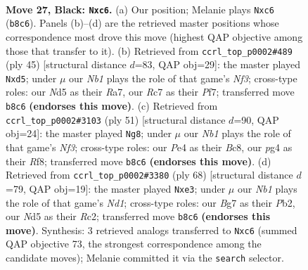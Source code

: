 \documentclass[11pt]{article}
\begin{document}
\clearpage

\begin{figure}[p]\centering
\begin{subfigure}{0.46\textwidth}\centering
\resizebox{\linewidth}{!}{%
\newchessgame
\chessboard[
  setfen={rn4k1/p1r3bp/PpN2p2/1P1n1R2/4pPP1/8/4B3/R1B1K3 b Q - 3 27},
  showmover=false,
  pgfstyle=straightmove, color=movearrow, markmove={b8-c6}
]}
\caption{}
\end{subfigure}\hfill
\begin{subfigure}{0.46\textwidth}\centering
\resizebox{\linewidth}{!}{%
\newchessgame
\chessboard[
  setfen={2b3k1/r4pp1/1p3n1p/p2N4/P1n2B2/2P3P1/4rPBP/RR4K1 b - - 0 23},
  showmover=false,
  pgfstyle=straightmove, color=movearrow, markmove={f6-d5}
]}
\caption{}
\end{subfigure}
\\[4pt]
\begin{subfigure}{0.46\textwidth}\centering
\resizebox{\linewidth}{!}{%
\newchessgame
\chessboard[
  setfen={1kb2r2/p2r3p/1p3npR/2pP4/2B3P1/1PN2P2/P7/2K3R1 b - - 8 26},
  showmover=false,
  pgfstyle=straightmove, color=movearrow, markmove={f6-g8}
]}
\caption{}
\end{subfigure}\hfill
\begin{subfigure}{0.46\textwidth}\centering
\resizebox{\linewidth}{!}{%
\newchessgame
\chessboard[
  setfen={1r4k1/r4p2/8/p1p3bp/P2p4/2P1nBP1/1PR4P/3NRK2 w - - 2 35},
  showmover=false,
  pgfstyle=straightmove, color=movearrow, markmove={d1-e3}
]}
\caption{}
\end{subfigure}
\caption{\textbf{Move 27, Black: \texttt{Nxc6}.} (a) Our position; Melanie plays \texttt{Nxc6} (\texttt{b8c6}). Panels (b)--(d) are the retrieved master positions whose correspondence most drove this move (highest QAP objective among those that transfer to it). (b) Retrieved from \texttt{ccrl\_top\_p0002\#489} (ply 45) [structural distance $d$=83, QAP obj=29]: the master played \texttt{Nxd5}; under $\mu$ our \emph{Nb1} plays the role of that game's \emph{Nf3}; cross-type roles: our \emph{N}d5 as their \emph{R}a7, our \emph{R}c7 as their \emph{P}f7; transferred move \texttt{b8c6} \textbf{(endorses this move)}. (c) Retrieved from \texttt{ccrl\_top\_p0002\#3103} (ply 51) [structural distance $d$=90, QAP obj=24]: the master played \texttt{Ng8}; under $\mu$ our \emph{Nb1} plays the role of that game's \emph{Nf3}; cross-type roles: our \emph{P}e4 as their \emph{B}c8, our \emph{p}g4 as their \emph{R}f8; transferred move \texttt{b8c6} \textbf{(endorses this move)}. (d) Retrieved from \texttt{ccrl\_top\_p0002\#3380} (ply 68) [structural distance $d$=79, QAP obj=19]: the master played \texttt{Nxe3}; under $\mu$ our \emph{Nb1} plays the role of that game's \emph{Nd1}; cross-type roles: our \emph{B}g7 as their \emph{P}b2, our \emph{N}d5 as their \emph{R}c2; transferred move \texttt{b8c6} \textbf{(endorses this move)}. Synthesis: 3 retrieved analogs transferred to \texttt{Nxc6} (summed QAP objective 73, the strongest correspondence among the candidate moves); Melanie committed it via the \texttt{search} selector.}
\label{fig:thought-m53}
\end{figure}
\end{document}
